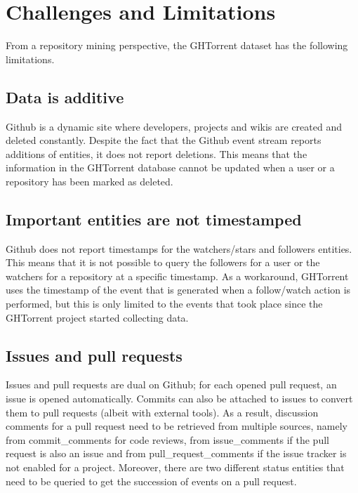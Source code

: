 \documentclass[conference]{IEEEtran}
\begin{document}
\section{Challenges and Limitations}

From a repository mining perspective, the GHTorrent dataset has the following
limitations. 

\subsection{Data is additive} Github is a dynamic site where developers, 
    projects and wikis are created and deleted constantly. Despite the fact
    that the Github event stream reports additions of entities, it does
    not report deletions. This means that the information in the GHTorrent 
    database cannot be updated when a user or a repository has been marked
    as deleted.

\subsection{Important entities are not timestamped}
\label{chal:timestamp}
Github does not report
    timestamps for the watchers/stars and followers entities. This means that it
    is not possible to query the followers for a user or the watchers for a
    repository at a specific timestamp. As a workaround, GHTorrent uses the
    timestamp of the event that is generated when a follow/watch action is
    performed, but this is only limited to the events that took place since
    the GHTorrent project started collecting data.


\subsection{Issues and pull requests} Issues and pull requests are dual on
Github; for each opened pull request, an issue is opened automatically.  Commits
can also be attached to issues to convert them to pull requests (albeit with
external tools). As a result, discussion comments for a pull request need to be
retrieved from multiple sources, namely from {\sf commit\_comments} for code
reviews, from {\sf issue\_comments} if the pull request is also an issue and
from {\sf pull\_request\_comments} if the issue tracker is not enabled for a
project. Moreover, there are two different status entities that need to be
queried to get the succession of events on a pull request.
\end{document}
